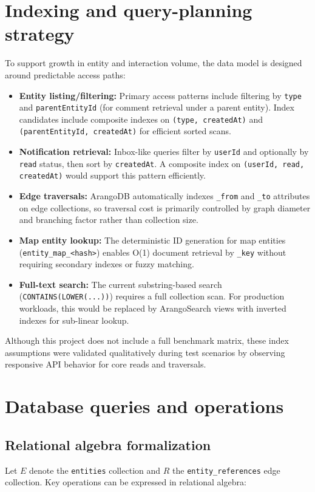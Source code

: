 \documentclass[13pt,a4paper]{report}
\begin{document}
\section{Indexing and query-planning strategy}
To support growth in entity and interaction volume, the data model is designed around predictable access paths:
\begin{itemize}
    \item \textbf{Entity listing/filtering:} Primary access patterns include filtering by \texttt{type} and \texttt{parentEntityId} (for comment retrieval under a parent entity). Index candidates include composite indexes on \texttt{(type, createdAt)} and \texttt{(parentEntityId, createdAt)} for efficient sorted scans.
    \item \textbf{Notification retrieval:} Inbox-like queries filter by \texttt{userId} and optionally by \texttt{read} status, then sort by \texttt{createdAt}. A composite index on \texttt{(userId,\allowbreak{} read,\allowbreak{} createdAt)} would support this pattern efficiently.
    \item \textbf{Edge traversals:} ArangoDB automatically indexes \texttt{\_from} and \texttt{\_to} attributes on edge collections, so traversal cost is primarily controlled by graph diameter and branching factor rather than collection size.
    \item \textbf{Map entity lookup:} The deterministic ID generation for map entities (\texttt{entity\_map\_<hash>}) enables O(1) document retrieval by \texttt{\_key} without requiring secondary indexes or fuzzy matching.
    \item \textbf{Full-text search:} The current substring-based search (\texttt{CONTAINS(LOWER(...))}) requires a full collection scan. For production workloads, this would be replaced by ArangoSearch views with inverted indexes for sub-linear lookup.
\end{itemize}
Although this project does not include a full benchmark matrix, these index assumptions were validated qualitatively during test scenarios by observing responsive API behavior for core reads and traversals.

\section{Database queries and operations}
\subsection{Relational algebra formalization}
Let $E$ denote the \texttt{entities} collection and $R$ the \texttt{entity\_references} edge collection. Key operations can be expressed in relational algebra:
\end{document}
